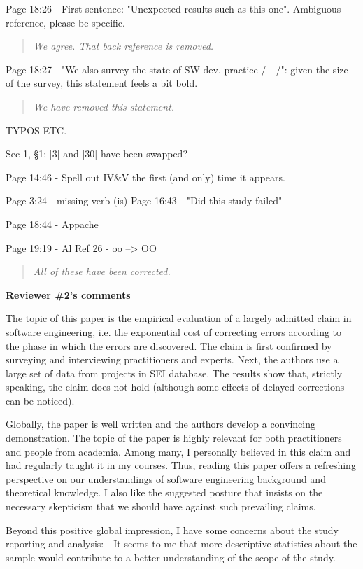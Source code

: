  
Page 18:26 - First sentence: "Unexpected results such as this one". Ambiguous reference,
please be specific.  
\begin{quote}{\em  We agree. That back reference is removed. }\end{quote}  



Page 18:27 - "We also survey the state of SW dev. practice /---/": given the size of the survey,
this statement feels a bit bold.

\begin{quote}{\em We have removed this statement.}\end{quote}  
 
TYPOS ETC.  

Sec 1, §1: [3] and [30] have been swapped?  

Page 14:46 - Spell out IV\&V the first (and only) time it appears.

Page 3:24 - missing verb (is) Page 16:43 - "Did this study failed" 

Page 18:44 - Appache 

Page 19:19 - Al Ref 26 - oo --> OO

\begin{quote}{\em  All of these have been corrected. }\end{quote}  

{\bf Reviewer \#2's comments}

The topic of this paper is the empirical
evaluation of a largely admitted claim in software
engineering, i.e. the exponential cost of correcting errors
according to the phase in which the errors are discovered.
The claim is first confirmed by surveying and interviewing
practitioners and experts. Next, the authors use a large set
of data from projects in SEI database. The results show
that, strictly speaking, the claim does not hold (although
some effects of delayed corrections can be noticed).

Globally, the paper is well written and the authors develop
a convincing demonstration. The topic of the paper is highly
relevant for both practitioners and people from academia.
Among many, I personally believed in this claim and had
regularly taught it in my courses. Thus, reading this paper
offers a refreshing perspective on our understandings of
software engineering background and theoretical knowledge. I
also like the suggested posture that insists on the
necessary skepticism that we should have against such
prevailing claims.

Beyond this positive global impression, I have some concerns
about the study reporting and analysis: -  It seems to me
that more descriptive statistics about the sample would
contribute to a better understanding of the scope of the
study. 


